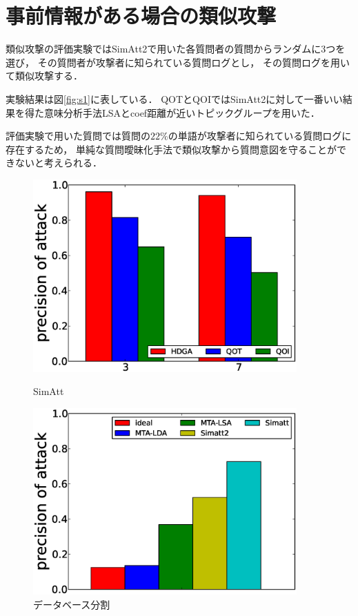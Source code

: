 \documentclass[master]{suribt}
\theoremstyle{definition}
\begin{document}
 \section{事前情報がある場合の類似攻撃}
 類似攻撃の評価実験ではSimAtt2で用いた各質問者の質問からランダムに3つを選び，
 その質問者が攻撃者に知られている質問ログとし，
 その質問ログを用いて類似攻撃する．
 
 実験結果は図\ref{fig:s1}に表している．
 QOTとQOIではSimAtt2に対して一番いい結果を得た意味分析手法LSAとcoef距離が近いトピックグループを用いた．

 評価実験で用いた質問では質問の$22\%$の単語が攻撃者に知られている質問ログに存在するため，
 単純な質問曖昧化手法で類似攻撃から質問意図を守ることができないと考えられる．

 \begin{figure}
 \begin{minipage}[t]{0.5\linewidth}
 \centering
 \includegraphics[width=0.9\textwidth]{SA2-2.eps}
 \vspace{5em}
 \caption{SimAtt}
 \label{fig:s1}
 \end{minipage}%
 \begin{minipage}[t]{0.5\linewidth}
 \centering
 \includegraphics[width=0.9\textwidth]{DS.eps}
 \vspace{5em}
 \caption{データベース分割}
 \label{fig:ds}
 \end{minipage}
 \end{figure}
\end{document}
